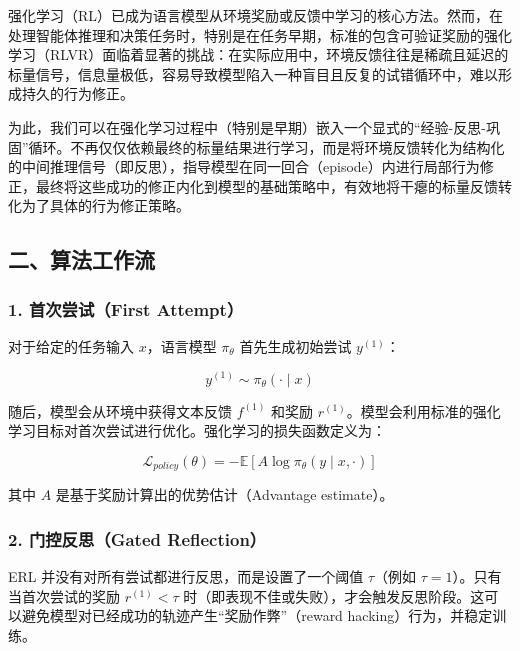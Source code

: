 强化学习（RL）已成为语言模型从环境奖励或反馈中学习的核心方法。然而，在处理智能体推理和决策任务时，特别是在任务早期，标准的包含可验证奖励的强化学习（RLVR）面临着显著的挑战：在实际应用中，环境反馈往往是稀疏且延迟的标量信号，信息量极低，容易导致模型陷入一种盲目且反复的试错循环中，难以形成持久的行为修正。

为此，我们可以在强化学习过程中（特别是早期）嵌入一个显式的``经验-反思-巩固''循环。不再仅仅依赖最终的标量结果进行学习，而是将环境反馈转化为结构化的中间推理信号（即反思），指导模型在同一回合（episode）内进行局部行为修正，最终将这些成功的修正内化到模型的基础策略中，有效地将干瘪的标量反馈转化为了具体的行为修正策略。

\hypertarget{ux4e8cux7b97ux6cd5ux5de5ux4f5cux6d41}{%
\subsection{二、算法工作流}\label{ux4e8cux7b97ux6cd5ux5de5ux4f5cux6d41}}

\hypertarget{ux9996ux6b21ux5c1dux8bd5first-attempt}{%
\subsubsection{1. 首次尝试（First Attempt）}\label{ux9996ux6b21ux5c1dux8bd5first-attempt}}

对于给定的任务输入 \(x\)，语言模型 \(\pi_\theta\) 首先生成初始尝试 \(y^{(1)}\)：

\[
y^{(1)} \sim \pi_\theta(\cdot \mid x)
\]

随后，模型会从环境中获得文本反馈 \(f^{(1)}\) 和奖励 \(r^{(1)}\)。模型会利用标准的强化学习目标对首次尝试进行优化。强化学习的损失函数定义为：

\[
\mathcal{L}_{policy}(\theta) = -\mathbb{E}[A \log \pi_\theta(y \mid x, \cdot)]
\]

其中 \(A\) 是基于奖励计算出的优势估计（Advantage estimate）。

\hypertarget{ux95e8ux63a7ux53cdux601dgated-reflection}{%
\subsubsection{2. 门控反思（Gated Reflection）}\label{ux95e8ux63a7ux53cdux601dgated-reflection}}

ERL 并没有对所有尝试都进行反思，而是设置了一个阈值 \(\tau\)（例如 \(\tau = 1\)）。只有当首次尝试的奖励 \(r^{(1)} < \tau\) 时（即表现不佳或失败），才会触发反思阶段。这可以避免模型对已经成功的轨迹产生``奖励作弊''（reward hacking）行为，并稳定训练。

